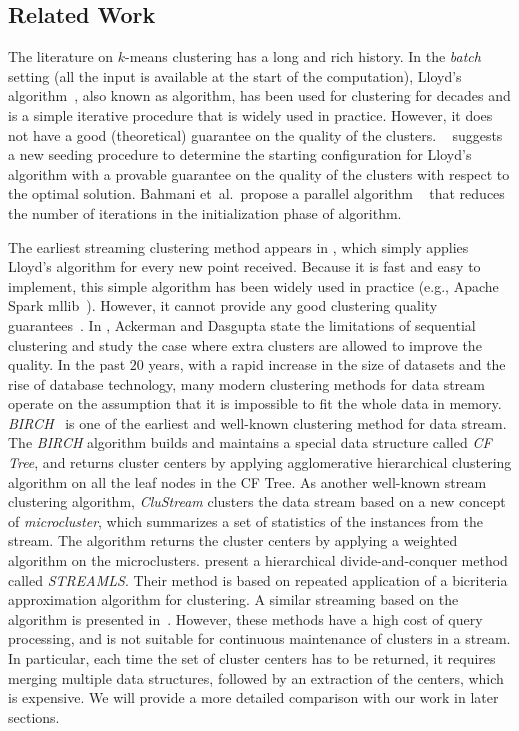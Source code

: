 \subsection{Related Work}
\label{sec:related}
The literature on $k$-means clustering has a long and rich history.  In the
\emph{batch} setting (all the input is available at the start of the
computation), Lloyd's algorithm~\cite{Lloyd82}, also known as \km algorithm, has
been used for \km clustering for decades and is a simple iterative procedure
that is widely used in practice. However, it does not have a good (theoretical)
guarantee on the quality of the clusters. \kmpp~\cite{AV07} suggests a new
seeding procedure to determine the starting configuration for Lloyd's algorithm
with a provable guarantee on the quality of the clusters with respect to the
optimal solution. Bahmani et~al.~propose a parallel algorithm
\kmII~\cite{BMV+12} that reduces the number of iterations in the initialization
phase of \kmpp algorithm.

The earliest streaming clustering method appears in \cite{MacQueen67} , which
simply applies Lloyd's algorithm for every new point received. Because it is
fast and easy to implement, this simple algorithm has been widely used in
practice (e.g., Apache Spark mllib~\cite{MBY+15}). However, it cannot provide
any good clustering quality guarantees~\cite{KMN+04}. In \cite{AD14}, Ackerman
and Dasgupta state the limitations of sequential clustering and study the case
where extra clusters are allowed to improve the quality.  In the past $20$
years, with a rapid increase in the size of datasets and the rise of database
technology, many modern clustering methods for data stream operate on the
assumption that it is impossible to fit the whole data in memory.
\textit{BIRCH}~\cite{ZRL96} is one of the earliest and well-known clustering
method for data stream. The \textit{BIRCH} algorithm builds and maintains a
special data structure called \textit{CF Tree}, and returns cluster centers by
applying agglomerative hierarchical clustering algorithm on all the leaf nodes
in the CF Tree. As another well-known stream clustering algorithm,
\textit{CluStream}\cite{AHW+03} clusters the data stream based on a new concept
of \textit{microcluster}, which summarizes a set of statistics of the instances
from the stream. The algorithm returns the cluster centers by applying a
weighted \km algorithm on the microclusters. \cite{GMM+03} present a
hierarchical divide-and-conquer method called \textit{STREAMLS}. Their method is
based on repeated application of a bicriteria approximation algorithm for
clustering. A similar streaming based on the \kmpp algorithm is presented
in~\cite{AJM09}. However, these methods have a high cost of query processing,
and is not suitable for continuous maintenance of clusters in a stream. In
particular, each time the set of cluster centers has to be returned, it requires
merging multiple data structures, followed by an extraction of the centers,
which is expensive. We will provide a more detailed comparison with our work in
later sections.

